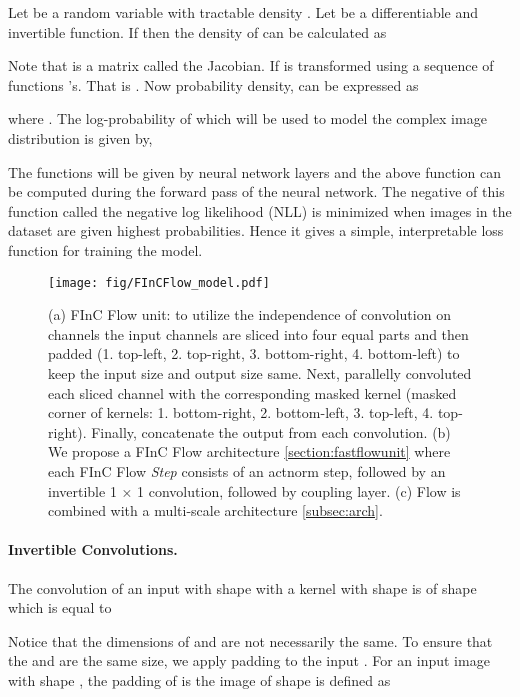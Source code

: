 \documentclass[a4paper,twoside]{article}
\theoremstyle{definition}
\begin{document}
Let  be a random variable with tractable density . Let  be a differentiable and invertible function. If  then the density of  can be calculated as 
 

Note that  is a  matrix called the Jacobian. If  is transformed using a sequence of functions 's. That is
. Now probability density,  can be expressed as 

where .
The log-probability of  which will be used to model the complex image distribution is given by,

The functions  will be given by neural network layers and the above function can be computed during the forward pass of the neural network. The negative of this function called the negative log likelihood (NLL) is minimized when images in the dataset are given highest probabilities. Hence it gives a simple, interpretable loss function for training the model. 

\begin{figure*}[!ht]
    \centering
    \texttt{[image: fig/FInCFlow\_model.pdf]}
    \caption{(a) FInC Flow unit: to utilize the independence of convolution on channels the input channels are sliced into four equal parts and then padded (1. top-left, 2. top-right, 3. bottom-right, 4. bottom-left) to keep the input size and output size same. Next, parallelly convoluted each sliced channel with the corresponding masked kernel (masked corner of kernels: 1. bottom-right, 2. bottom-left, 3. top-left, 4. top-right). Finally, concatenate the output from each convolution. (b) We propose a FInC Flow architecture  \ref{section:fastflowunit} where each FInC Flow \emph{Step}  consists of an actnorm step, followed by an invertible 1 × 1 convolution, followed by coupling layer. (c) Flow is combined with a multi-scale architecture \ref{subsec:arch}.}
    \label{fastflow}
\end{figure*}

\paragraph{Invertible Convolutions.}

The convolution of an input  with shape  with a kernel  with shape  is  of shape  which is equal to

Notice that the dimensions of  and  are not necessarily the same. To ensure that the  and  are the same size, we apply padding to the input . For an input image  with shape , the  padding of  is the image  of shape  is defined as
\end{document}
